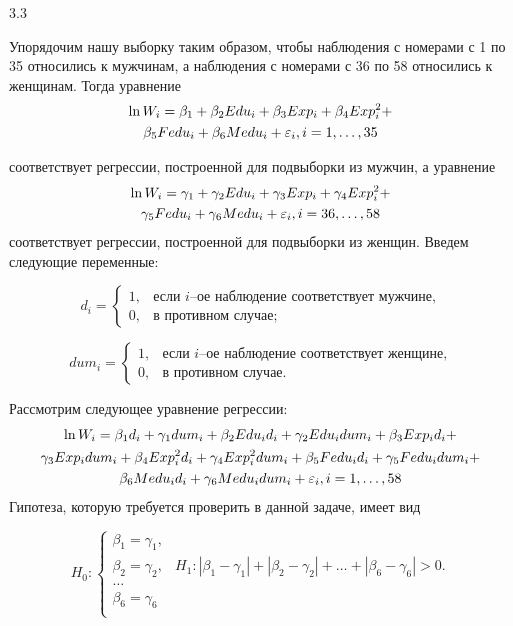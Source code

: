 \begin{solution}{{3.3}}

Упорядочим нашу выборку таким образом, чтобы наблюдения с номерами с 1 по 35 относились к мужчинам, а наблюдения с номерами с 36 по 58 относились к женщинам.
Тогда уравнение
\begin{multline*}
\ln W_i=\beta_1+\beta_2 Edu_i+\beta_3 Exp_i+\beta_4 Exp_i^2+\\
\beta_5 Fedu_i+\beta_6 Medu_i+\varepsilon_i, i=1, \ldots, 35
\end{multline*}

соответствует регрессии, построенной для подвыборки из мужчин, а уравнение
\begin{multline*}
\ln W_i=\gamma_1+\gamma_2 Edu_i+\gamma_3 Exp_i+\gamma_4 Exp_i^2+\\
\gamma_5 Fedu_i+\gamma_6 Medu_i+\varepsilon_i, i=36, \ldots, 58
\end{multline*}
соответствует регрессии, построенной для подвыборки из женщин. Введем следующие переменные:

\[
d_i =
\begin{cases}
    1, & \text{если $i$--ое наблюдение соответствует мужчине,} \\
    0, & \text{в противном случае;}
\end{cases}
\]

\[
dum_i =
\begin{cases}
    1, & \text{если $i$--ое наблюдение соответствует женщине,} \\
    0, & \text{в противном случае.}
\end{cases}
\]

Рассмотрим следующее уравнение регрессии:
\begin{multline*}
\ln W_i=\beta_1 d_i+\gamma_1 dum_i+\beta_2 Edu_i d_i+\gamma_2
Edu_i dum_i+\beta_3 Exp_i d_i+\\
\gamma_3 Exp_i dum_i+\beta_4 Exp_i^2 d_i + \gamma_4 Exp_i^2 dum_i + \beta_5 Fedu_i d_i +\gamma_5 Fedu_i dum_i+\\
\beta_6 Medu_i d_i+\gamma_6 Medu_i dum_i+\varepsilon_i, i=1, \ldots, 58
\end{multline*}
Гипотеза, которую требуется проверить в данной задаче, имеет вид

\[
H_0:
  \begin{cases}
    \beta_1 =\gamma_1, \\
    \beta_2 =\gamma_2 , & H_1:|\beta_1-\gamma_1|+|\beta_2-\gamma_2|+\dots+|\beta_6-\gamma_6| > 0.\\
    \dots   \\
    \beta_6=\gamma_6 \\
 \end{cases}
\]


\end{solution}
